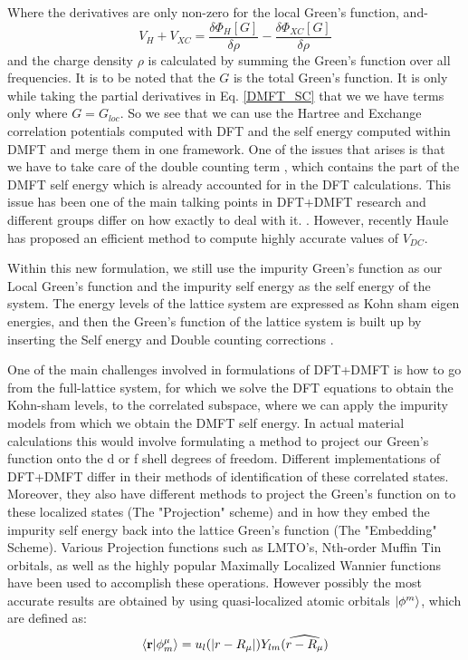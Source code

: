 \documentclass[10pt]{ruthesis}
\begin{document}
 Where the derivatives are only non-zero for the local Green's function, and-
 \begin{equation}
V_H+V_{XC}=\dfrac{\delta \Phi_{H}[G]}{\delta  \rho}- \dfrac{\delta  \Phi_{XC}[G]}{\delta  \rho}
 \end{equation}
 and the charge density $\rho$ is calculated by summing the Green's function over all frequencies. It is to be noted that the $G$ is the total Green's function. It is only while taking the partial derivatives in Eq. \ref{DMFT_SC} that we we have terms only where $G=G_{loc}$. So we see that we can use the Hartree and Exchange correlation potentials computed with DFT and the self energy computed within DMFT and merge them in one framework. One of the issues that arises is that we have to take care of the double counting term , which contains the part of the DMFT self energy which is already accounted for in the DFT calculations. This issue has been one of the main talking points in DFT+DMFT research and different groups differ on how exactly to deal with it. \cite{Millis_DC}  \cite{Sawatsky_DC} . However, recently Haule \cite{Haule_DC} has proposed an efficient method to compute highly accurate values of $V_{DC} $.
 
 Within this new formulation, we still use the impurity Green's function as our Local Green's function and the impurity self energy as the self energy of the system. The energy levels of the lattice system are expressed as Kohn sham eigen energies, and then the Green's function of the lattice system is built up by inserting the Self energy and Double counting corrections . 
 
One of the main challenges involved in formulations of DFT+DMFT is how to go from the full-lattice system, for which we solve the DFT equations to obtain the Kohn-sham levels, to the correlated subspace, where we can apply the impurity models from which we obtain the DMFT self energy. In actual material calculations this would involve formulating a method to project our Green's function onto the d or f shell degrees of freedom. Different implementations of DFT+DMFT differ in their methods of identification of these correlated states. Moreover, they also have different methods to project the Green's function on to these localized states (The "Projection" scheme) and in how they embed the impurity self energy back into the lattice Green's function (The "Embedding" Scheme). Various Projection functions such as LMTO's, Nth-order Muffin Tin orbitals, as well as the highly popular Maximally Localized Wannier functions have been used to accomplish these operations. However possibly the most accurate results are obtained by using quasi-localized atomic orbitals $|\phi^m \rangle$, which are defined as:
\begin{equation}\label{Projector}
\langle \mathbf{r} |\phi_m^\mu \rangle= u_l(|r-R_\mu|) Y_{lm}(\widehat{r-R_\mu})
\end{equation}
\end{document}
